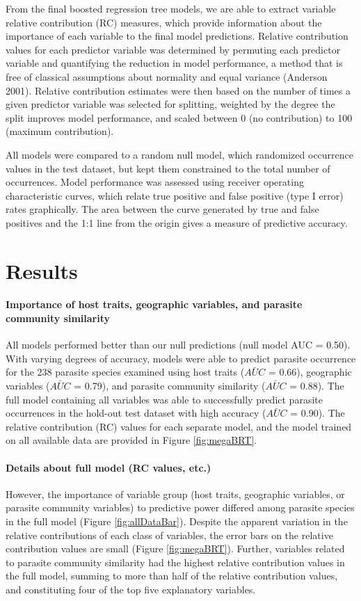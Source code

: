 \documentclass[12pt]{article}
\begin{document}
  From the final boosted regression tree models, we are able to extract variable relative contribution (RC) measures, which provide information about the importance of each variable to the final model predictions. Relative contribution values for each predictor variable was determined by permuting each predictor variable and quantifying the reduction in model performance, a method that is free of classical assumptions about normality and equal variance (Anderson 2001). Relative contribution estimates were then based on the number of times a given predictor variable was selected for splitting, weighted by the degree the split improves model performance, and scaled between 0 (no contribution) to 100 (maximum contribution). 
  
  All models were compared to a random null model, which randomized occurrence values in the test dataset, but kept them constrained to the total number of occurrences. Model performance was assessed using receiver operating characteristic curves, which relate true positive and false positive (type I error) rates graphically. The area between the curve generated by true and false positives and the 1:1 line from the origin gives a measure of predictive accuracy. 
  
   
\section{Results}

  \paragraph{Importance of host traits, geographic variables, and parasite community similarity}
   All models performed better than our null predictions (null model AUC = 0.50). With varying degrees of accuracy, models were able to predict parasite occurrence for the 238 parasite species examined using host traits ($\bar{AUC}$ = 0.66), geographic variables ($\bar{AUC}$ = 0.79), and parasite community similarity ($\bar{AUC}$ = 0.88). The full model containing all variables was able to successfully predict parasite occurrences in the hold-out test dataset with high accuracy ($\bar{AUC}$ = 0.90). The relative contribution (RC) values for each separate model, and the model trained on all available data are provided in Figure \ref{fig:megaBRT}. 
  
  \paragraph{Details about full model (RC values, etc.)}
  However, the importance of variable group (host traits, geographic variables, or parasite community variables) to predictive power differed among parasite species in the full model (Figure \ref{fig:allDataBar}). Despite the apparent variation in the relative contributions of each class of variables, the error bars on the relative contribution values are small (Figure \ref{fig:megaBRT}). Further, variables related to parasite community similarity had the highest relative contribution values in the full model, summing to more than half of the relative contribution values, and constituting four of the top five explanatory variables.  
  
\end{document}
